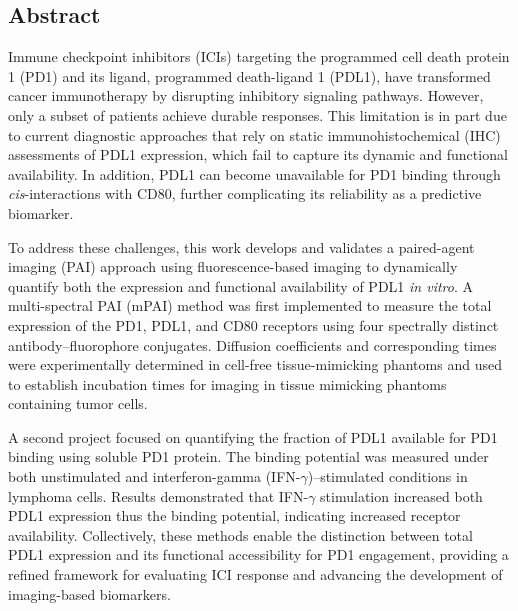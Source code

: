 \pagestyle{plain}
\begin{center}


\section*{Abstract}


\end{center}

Immune checkpoint inhibitors (ICIs) targeting the programmed cell death protein 1 (PD1) and its ligand, programmed death-ligand 1 (PDL1), have transformed cancer immunotherapy by disrupting inhibitory signaling pathways. However, only a subset of patients achieve durable responses. This limitation is in part due to current diagnostic approaches that rely on static immunohistochemical (IHC) assessments of PDL1 expression, which fail to capture its dynamic and functional availability. In addition, PDL1 can become unavailable for PD1 binding through \textit{cis}-interactions with CD80, further complicating its reliability as a predictive biomarker.

To address these challenges, this work develops and validates a paired-agent imaging (PAI) approach using fluorescence-based imaging to dynamically quantify both the expression and functional availability of PDL1 \textit{in vitro}. A multi-spectral PAI (mPAI) method was first implemented to measure the total expression of the PD1, PDL1, and CD80 receptors using four spectrally distinct antibody–fluorophore conjugates. Diffusion coefficients and corresponding times were experimentally determined in cell-free tissue-mimicking phantoms and used to establish incubation times for imaging in tissue mimicking phantoms containing tumor cells.

A second project focused on quantifying the fraction of PDL1 available for PD1 binding using soluble PD1 protein. The binding potential was measured under both unstimulated and interferon-gamma (IFN-$\gamma$)–stimulated conditions in lymphoma cells. Results demonstrated that IFN-$\gamma$ stimulation increased both PDL1 expression thus the binding potential, indicating increased receptor availability. Collectively, these methods enable the distinction between total PDL1 expression and its functional accessibility for PD1 engagement, providing a refined framework for evaluating ICI response and advancing the development of imaging-based biomarkers.

\cleardoublepage

